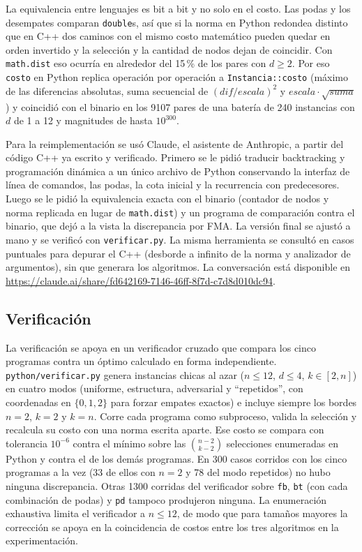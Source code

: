 La equivalencia entre lenguajes es bit a bit y no solo en el costo. Las podas y los desempates comparan \texttt{double}s, así que si la norma en Python redondea distinto que en C++ dos caminos con el mismo costo matemático pueden quedar en orden invertido y la selección y la cantidad de nodos dejan de coincidir. Con \texttt{math.dist} eso ocurría en alrededor del 15\,\% de los pares con $d \ge 2$. Por eso \texttt{costo} en Python replica operación por operación a \texttt{Instancia::costo} (máximo de las diferencias absolutas, suma secuencial de $(\mathit{dif}/\mathit{escala})^2$ y $\mathit{escala} \cdot \sqrt{\mathit{suma}}$) y coincidió con el binario en los 9107 pares de una batería de 240 instancias con $d$ de 1 a 12 y magnitudes de hasta $10^{300}$.

Para la reimplementación se usó Claude, el asistente de Anthropic, a partir del código C++ ya escrito y verificado. Primero se le pidió traducir backtracking y programación dinámica a un único archivo de Python conservando la interfaz de línea de comandos, las podas, la cota inicial y la recurrencia con predecesores. Luego se le pidió la equivalencia exacta con el binario (contador de nodos y norma replicada en lugar de \texttt{math.dist}) y un programa de comparación contra el binario, que dejó a la vista la discrepancia por FMA. La versión final se ajustó a mano y se verificó con \texttt{verificar.py}. La misma herramienta se consultó en casos puntuales para depurar el C++ (desborde a infinito de la norma y analizador de argumentos), sin que generara los algoritmos. La conversación está disponible en \url{https://claude.ai/share/fd642169-7146-46ff-8f7d-c7d8d010dc94}.

\subsection{Verificación}\label{sec:testing}

La verificación se apoya en un verificador cruzado que compara los cinco programas contra un óptimo calculado en forma independiente. \texttt{python/verificar.py} genera instancias chicas al azar ($n \le 12$, $d \le 4$, $k \in [2, n]$) en cuatro modos (uniforme, estructura, adversarial y ``repetidos'', con coordenadas en $\{0, 1, 2\}$ para forzar empates exactos) e incluye siempre los bordes $n = 2$, $k = 2$ y $k = n$. Corre cada programa como subproceso, valida la selección y recalcula su costo con una norma escrita aparte. Ese costo se compara con tolerancia $10^{-6}$ contra el mínimo sobre las $\binom{n-2}{k-2}$ selecciones enumeradas en Python y contra el de los demás programas. En 300 casos corridos con los cinco programas a la vez (33 de ellos con $n = 2$ y 78 del modo repetidos) no hubo ninguna discrepancia. Otras 1300 corridas del verificador sobre \texttt{fb}, \texttt{bt} (con cada combinación de podas) y \texttt{pd} tampoco produjeron ninguna. La enumeración exhaustiva limita el verificador a $n \le 12$, de modo que para tamaños mayores la corrección se apoya en la coincidencia de costos entre los tres algoritmos en la experimentación.

